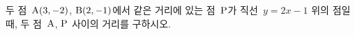 두 점~$\mathrm{A}(3{,}\mkern3mu\mathopen{}-2)$, $\mathrm{B}(2{,}\mkern3mu\mathopen{}-1)$에서 같은 거리에 있는 점~$\mathrm{P}$가 직선~$y=2x-1$ 위의 점일 때, 두 점~$\mathrm{A}$, $\mathrm{P}$ 사이의 거리를 구하시오.
